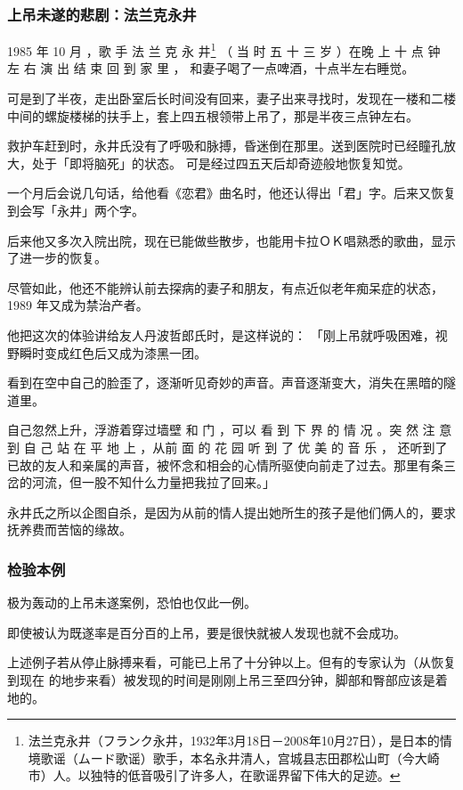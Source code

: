 \documentclass[UTF8]{ctexart}
\begin{document}
\subsubsection*{上吊未遂的悲剧：法兰克永井}

1985 年 10 月 ，歌 手 法 兰 克 永 井\footnote{法兰克永井（フランク永井，1932年3月18日－2008年10月27日），是日本的情境歌谣（ムード歌谣）歌手，本名永井清人，宫城县志田郡松山町（今大崎市）人。以独特的低音吸引了许多人，在歌谣界留下伟大的足迹。} （ 当 时 五 十 三 岁 ）在晚 上 十 点 钟 左 右 演 出 结 束 回 到 家 里 ， 和妻子喝了一点啤酒，十点半左右睡觉。

可是到了半夜，走出卧室后长时间没有回来，妻子出来寻找时，发现在一楼和二楼中间的螺旋楼梯的扶手上，套上四五根领带上吊了，那是半夜三点钟左右。

救护车赶到时，永井氏没有了呼吸和脉搏，昏迷倒在那里。送到医院时已经瞳孔放大，处于「即将脑死」的状态。
可是经过四五天后却奇迹般地恢复知觉。

一个月后会说几句话，给他看《恋君》曲名时，他还认得出「君」字。后来又恢复到会写「永井」两个字。

后来他又多次入院出院，现在已能做些散步，也能用卡拉ＯＫ唱熟悉的歌曲，显示了进一步的恢复。

尽管如此，他还不能辨认前去探病的妻子和朋友，有点近似老年痴呆症的状态，1989 年又成为禁治产者。

他把这次的体验讲给友人丹波哲郎氏时，是这样说的： 「刚上吊就呼吸困难，视野瞬时变成红色后又成为漆黑一团。

看到在空中自己的脸歪了，逐渐听见奇妙的声音。声音逐渐变大，消失在黑暗的隧道里。

自己忽然上升，浮游着穿过墙壁 和 门 ，可以 看 到 下 界 的 情 况 。突 然 注 意 到 自 己 站 在 平 地 上 ，从前 面 的 花 园 听 到 了 优 美 的 音 乐 ， 还听到了已故的友人和亲属的声音，被怀念和相会的心情所驱使向前走了过去。那里有条三岔的河流，但一股不知什么力量把我拉了回来。」 

永井氏之所以企图自杀，是因为从前的情人提出她所生的孩子是他们俩人的，要求抚养费而苦恼的缘故。

\subsubsection*{检验本例}

极为轰动的上吊未遂案例，恐怕也仅此一例。

即使被认为既遂率是百分百的上吊，要是很快就被人发现也就不会成功。

上述例子若从停止脉搏来看，可能已上吊了十分钟以上。但有的专家认为（从恢复到现在
的地步来看）被发现的时间是刚刚上吊三至四分钟，脚部和臀部应该是着地的。
\end{document}
